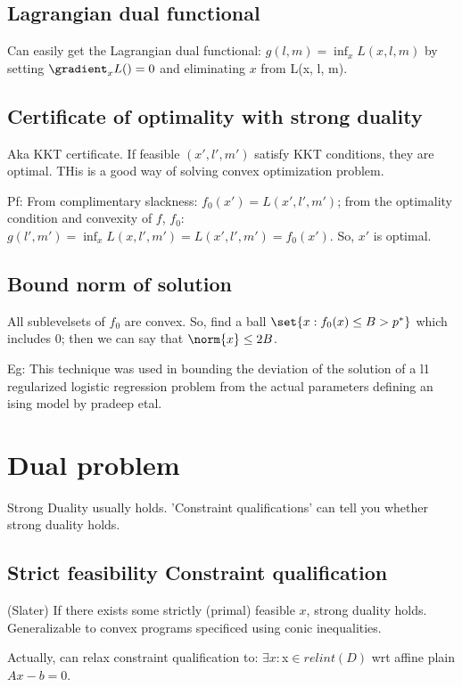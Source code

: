 \documentclass[oneside, article]{memoir}
\begin{document}
\subsection{Lagrangian dual functional}
Can easily get the Lagrangian dual functional: $g(l, m) = \inf_x L(x, l, m)$ by setting $\gradient_x L() = 0$ and eliminating $x$ from L(x, l, m).

\subsection{Certificate of optimality with strong duality}
Aka KKT certificate. If feasible $(x', l', m')$ satisfy KKT conditions, they are optimal. THis is a good way of solving convex optimization problem.

Pf: From complimentary slackness: $f_0(x') = L(x', l', m')$; from the optimality condition and convexity of $f$, $f_0$: \\
$g(l', m') = \inf_x L(x, l', m') = L(x', l', m') = f_0(x')$. So, $x'$ is optimal.

\subsection{Bound norm of solution}
All sublevelsets of $f_0$ are convex. So, find a ball $\set{x: f_0(x) \leq B > p^{*}}$ which includes $0$; then we can say that $\norm{x} \leq 2B$.

Eg: This technique was used in bounding the deviation of the solution of a l1 regularized logistic regression problem from the actual parameters defining an ising model by pradeep etal.

\section{Dual problem}
Strong Duality usually holds. 'Constraint qualifications' can tell you whether strong duality holds.

\subsection{Strict feasibility Constraint qualification}
(Slater) If there exists  some strictly (primal) feasible $x$, strong duality holds.  Generalizable to convex programs specificed using conic inequalities.

Actually, can relax constraint qualification to: $\exists x: $x$ \in relint(D)$ wrt affine plain $Ax - b = 0$.
\end{document}
